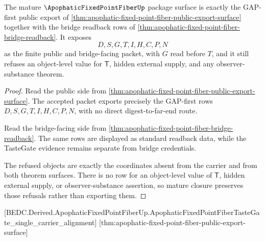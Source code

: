 \begin{theorem}
\label{thm:apophatic-fixed-point-fiber-mature-boundary}
The mature $\ApophaticFixedPointFiberUp$ package surface is exactly the GAP-first public export of \autoref{thm:apophatic-fixed-point-fiber-public-export-surface} together with the bridge readback rows of \autoref{thm:apophatic-fixed-point-fiber-bridge-readback}. It exposes
$$
D,S,G,T,I,H,C,P,N
$$
as the finite public and bridge-facing packet, with $G$ read before $T$, and it still refuses an object-level value for $\mathsf{T}$, hidden external supply, and any observer-substance theorem.
\end{theorem}
\begin{proof}
Read the public side from \autoref{thm:apophatic-fixed-point-fiber-public-export-surface}. The accepted packet exports precisely the GAP-first rows $D,S,G,T,I,H,C,P,N$, with no direct digest-to-far-end route.

Read the bridge-facing side from \autoref{thm:apophatic-fixed-point-fiber-bridge-readback}. The same rows are displayed as standard readback data, while the TasteGate evidence remains separate from bridge credentials.

The refused objects are exactly the coordinates absent from the carrier and from both theorem surfaces. There is no row for an object-level value of $\mathsf{T}$, hidden external supply, or observer-substance assertion, so mature closure preserves those refusals rather than exporting them.
\end{proof}

[BEDC.Derived.ApophaticFixedPointFiberUp.ApophaticFixedPointFiberTasteGate\_single\_carrier\_alignment]
[thm:apophatic-fixed-point-fiber-public-export-surface]


